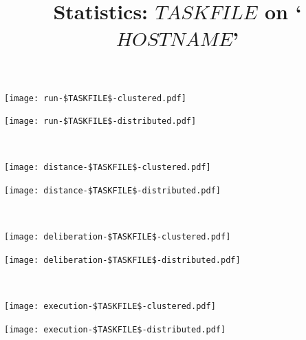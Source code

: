 \documentclass[11pt,a4paper]{article}
\title{Statistics: $TASKFILE$ on `$HOSTNAME$'}
\author{}
\date{}
\begin{document}
\maketitle

\noindent
\begin{minipage}{0.5\textwidth}
\texttt{[image: run-\$TASKFILE\$-clustered.pdf]}
\end{minipage}
\begin{minipage}{0.5\textwidth}
\texttt{[image: run-\$TASKFILE\$-distributed.pdf]}
\end{minipage}
\\[0.2cm]


\noindent
\begin{minipage}{0.5\textwidth}
\texttt{[image: distance-\$TASKFILE\$-clustered.pdf]}
\end{minipage}
\begin{minipage}{0.5\textwidth}
\texttt{[image: distance-\$TASKFILE\$-distributed.pdf]}
\end{minipage}
\\[0.5cm]

\noindent
\begin{minipage}{0.5\textwidth}
\texttt{[image: deliberation-\$TASKFILE\$-clustered.pdf]}
\end{minipage}
\begin{minipage}{0.5\textwidth}
\texttt{[image: deliberation-\$TASKFILE\$-distributed.pdf]}
\end{minipage}
\\[0.2cm]

\noindent
\begin{minipage}{0.5\textwidth}
\texttt{[image: execution-\$TASKFILE\$-clustered.pdf]}
\end{minipage}
\begin{minipage}{0.5\textwidth}
\texttt{[image: execution-\$TASKFILE\$-distributed.pdf]}
\end{minipage}
\\[0.2cm]
\end{document}
